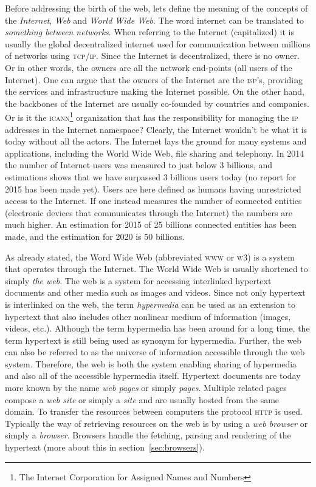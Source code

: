 \documentclass[a4paper,11pt]{kth-mag}
\begin{document}
      Before addressing the birth of the web, lets define the meaning of the concepts of the \emph{Internet}, \emph{Web} and \emph{World Wide Web}.
      The word internet can be translated to \emph{something between networks}. 
      When referring to the Internet (capitalized) it is usually the global decentralized internet used for communication between millions of networks using \textsc{tcp/ip}.
      Since the Internet is decentralized, there is no owner.
      Or in other words, the owners are all the network end-points (all users of the Internet).
      One can argue that the owners of the Internet are the \textsc{isp}'s, providing the services and infrastructure making the Internet possible.
      On the other hand, the backbones of the Internet are usually co-founded by countries and companies.
      Or is it the \textsc{icann}\footnote{The Internet Corporation for Assigned Names and Numbers} organization that has the responsibility for managing the \textsc{ip} addresses in the Internet namespace?
      Clearly, the Internet wouldn't be what it is today without all the actors.
      The Internet lays the ground for many systems and applications, including the World Wide Web, file sharing and telephony.
      In 2014 the number of Internet users was measured to just below 3 billions, and estimations shows that we have surpassed 3 billions users today (no report for 2015 has been made yet).
      Users are here defined as humans having unrestricted access to the Internet.
      If one instead measures the number of connected entities (electronic devices that communicates through the Internet) the numbers are much higher.
      An estimation for 2015 of 25 billions connected entities has been made, and the estimation for 2020 is 50 billions.
      
      As already stated, the Word Wide Web (abbreviated \textsc{www} or \textsc{w3}) is a system that operates through the Internet.
      The World Wide Web is usually shortened to simply \emph{the web}.
      The web is a system for accessing interlinked hypertext documents and other media such as images and videos.
      Since not only hypertext is interlinked on the web, the term \emph{hypermedia} can be used as an extension to hypertext that also includes other nonlinear medium of information (images, videos, etc.).
      Although the term hypermedia has been around for a long time, the term hypertext is still being used as synonym for hypermedia.
      Further, the web can also be referred to as the universe of information accessible through the web system.
      Therefore, the web is both the system enabling sharing of hypermedia and also all of the accessible hypermedia itself.
      Hypertext documents are today more known by the name \emph{web pages} or simply \emph{pages}.
      Multiple related pages compose a \emph{web site} or simply a \emph{site} and are usually hosted from the same domain.
      To transfer the resources between computers the protocol \textsc{http} is used.
      Typically the way of retrieving resources on the web is by using a \emph{web browser} or simply a \emph{browser}.
      Browsers handle the fetching, parsing and rendering of the hypertext (more about this in section~\ref{sec:browsers}).
      
\end{document}
